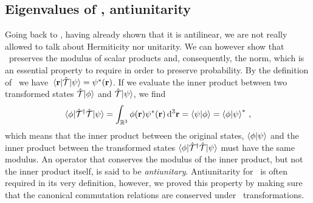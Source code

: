         \subsection{Eigenvalues of \hT, antiunitarity}
            Going back to \hT, having already shown that it is antilinear, we are not really allowed to talk about Hermiticity nor unitarity. We can however show that \hT\ preserves the modulus of scalar products and, consequently, the norm, which is an essential property to require in order to preserve probability. By the definition of \hT\ we have $\mel{\vb{r}}{\hT}{\psi} = \psi^*\pqty{\vb{r}}$. If we evaluate the inner product between two transformed states $\mathcal{\hat{T}}\!\ket{\phi}$ and $\mathcal{\hat{T}}\!\ket{\psi}$, we find
            \begin{equation*}
                \bra{\phi}\!\hT^\dag\hT\!\ket{\psi}
                = \int\nolimits_{\bbR^3} \phi\pqty{\vb{r}}\psi^*\pqty{\vb{r}}\dd[3]{\vb{r}}
                = \bra{\psi}\ket{\phi}
                = \bra{\phi}\ket{\psi}^*
                \mycomma
            \end{equation*}
            which means that the inner product between the original states, $\braket{\phi}{\psi}$ and the inner product between the transformed states $\bra{\phi}\!\mathcal{\hat{T}}^\dag\mathcal{\hat{T}}\!\ket{\psi}$ must have the same modulus. An operator that conserves the modulus of the inner product, but not the inner product itself, is said to be \emph{antiunitary}. Antiunitarity for \hT\ is often required in its very definition, however, we proved this property by making sure that the canonical commutation relations are conserved under \mcT\ transformations.
            
